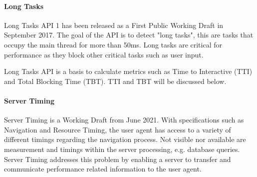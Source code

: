 	









\paragraph{Long Tasks}

Long Tasks API 1 has been released as a First Public Working Draft in September 2017.
The goal of the API is to detect "long tasks", this are tasks that occupy the main thread for more than 50ms.
Long tasks are critical for performance as they block other critical tasks such as user input. %

Long Tasks API is a basis to calculate metrics such as  Time to Interactive (TTI) and Total Blocking Time (TBT). %
TTI and TBT will be discussed below.







\paragraph{Server Timing}

Server Timing is a Working Draft from June 2021.
With specifications such as Navigation and Resource Timing, the user agent has access to a variety of different timings regarding the navigation process.
Not visible nor available are measurement and timings within the server processing, e.g. database queries.
Server Timing addresses this problem by enabling a server to transfer and communicate performance related information to the user agent. %




